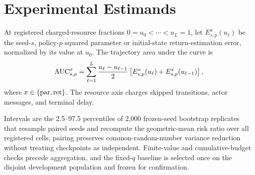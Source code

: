 \section{Experimental Estimands}
At registered charged-resource fractions $0=u_0<\cdots<u_L=1$, let $E^x_{s,p}(u_\ell)$ be the seed-$s$, policy-$p$ squared parameter or initial-state return-estimation error, normalized by its value at $u_0$.
The trajectory area under the curve is
\begin{equation}
{\rm AUC}_{s,p}^{x}=\sum_{\ell=1}^{L}
\frac{u_\ell-u_{\ell-1}}{2}
\left[E_{s,p}^{x}(u_\ell)+E_{s,p}^{x}(u_{\ell-1})\right],
\end{equation}
where $x\in\{{\rm par},{\rm ret}\}$.
The resource axis charges skipped transitions, actor messages, and terminal delay.

Intervals are the 2.5--97.5 percentiles of 2,000 frozen-seed bootstrap replicates that resample paired seeds and recompute the geometric-mean risk ratio over all registered cells; pairing preserves common-random-number variance reduction without treating checkpoints as independent.
Finite-value and cumulative-budget checks precede aggregation, and the fixed-$q$ baseline is selected once on the disjoint development population and frozen for confirmation.
